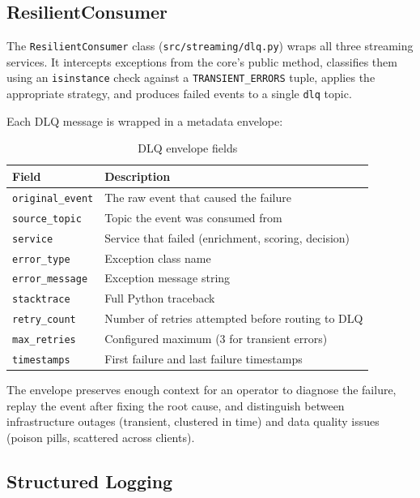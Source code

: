 \subsection{ResilientConsumer}

The \texttt{ResilientConsumer} class (\texttt{src/streaming/dlq.py}) wraps all
three streaming services. It intercepts exceptions from the core's public
method, classifies them using an \texttt{isinstance} check against a
\texttt{TRANSIENT\_ERRORS} tuple, applies the appropriate strategy, and
produces failed events to a single \texttt{dlq} topic.

Each DLQ message is wrapped in a metadata envelope:

\begin{table}[H]
\centering
\caption{DLQ envelope fields}
\label{tab:dlq-envelope}
\begin{tabular}{@{}lp{7.5cm}@{}}
\toprule
\textbf{Field} & \textbf{Description} \\
\midrule
\texttt{original\_event}  & The raw event that caused the failure \\
\texttt{source\_topic}    & Topic the event was consumed from \\
\texttt{service}          & Service that failed (enrichment, scoring, decision) \\
\texttt{error\_type}      & Exception class name \\
\texttt{error\_message}   & Exception message string \\
\texttt{stacktrace}       & Full Python traceback \\
\texttt{retry\_count}     & Number of retries attempted before routing to DLQ \\
\texttt{max\_retries}     & Configured maximum (3 for transient errors) \\
\texttt{timestamps}       & First failure and last failure timestamps \\
\bottomrule
\end{tabular}
\end{table}

The envelope preserves enough context for an operator to diagnose the failure,
replay the event after fixing the root cause, and distinguish between
infrastructure outages (transient, clustered in time) and data quality issues
(poison pills, scattered across clients).

\subsection{Structured Logging}

